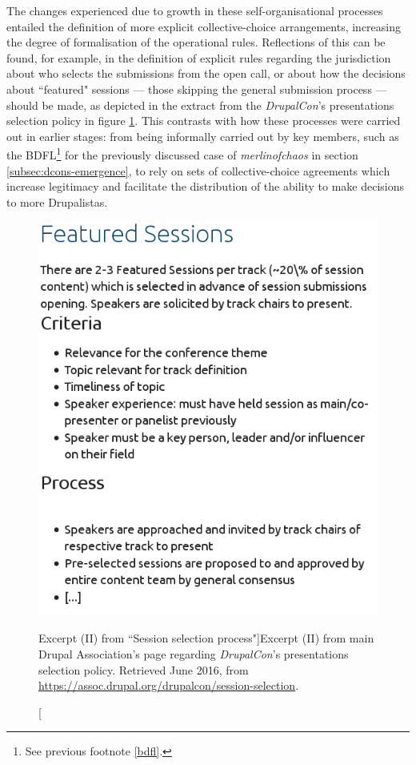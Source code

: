 The changes experienced due to growth in these self-organisational processes entailed the definition of more explicit collective-choice arrangements, increasing the degree of formalisation of the operational rules. Reflections of this can be found, for example, in the definition of explicit rules regarding the jurisdiction about who selects the submissions from the open call, or about how the decisions about ``featured" sessions  --- those skipping the general submission process --- should be made, as depicted in the extract from the \textit{DrupalCon}'s presentations selection policy in figure \ref{da-dcon-selec02}. This contrasts with how these processes were carried out in earlier stages: from being informally carried out by key members, such as the BDFL\footnote{See previous footnote \ref{bdfl}.} for the previously discussed case of \textit{merlinofchaos} in section \ref{subsec:dcons-emergence}, to rely on sets of collective-choice agreements which increase legitimacy and facilitate the distribution of the ability to make decisions to more Drupalistas.

\begin{figure}[H]
\centering
\includegraphics[scale=0.5]{img/quotes_replacement/dcon_sesssion_policy_june16_03.png}
\caption[Excerpt (II) from ``Session selection process"]{Excerpt (II) from main Drupal Association's page regarding \textit{DrupalCon}'s presentations selection policy. Retrieved  June 2016, from \url{https://assoc.drupal.org/drupalcon/session-selection}.}
\label{da-dcon-selec02}
\end{figure}

